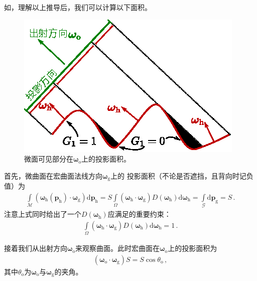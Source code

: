 如，理解以上推导后，我们可以计算以下面积。
\begin{figure}[htbp]
    \centering
    \includegraphics[width=0.5\linewidth]{Pictures/chap08/ProjectionsMicrofacet.eps}
    \caption{微面可见部分在${\bm\omega}_{\mathrm{o}}$上的投影面积。}
    \label{fig:08ex01-ProjectionsMicrofacetArea}
\end{figure}

首先，微曲面在宏曲面法线方向${\bm\omega}_{\mathrm{g}}$上的
投影面积（不论是否遮挡，且背向时记负值）为
\begin{align}
    \int\limits_{\mathcal{M}}({\bm\omega}_{\mathrm{h}}({\bm p}_{\mathrm{h}})
    \cdot{\bm\omega}_{\mathrm{g}})\mathrm{d}{\bm p}_{\mathrm{h}}
    =S\int\limits_{\varOmega}({\bm\omega}_{\mathrm{h}}\cdot{\bm\omega}_{\mathrm{g}})
    D({\bm\omega}_{\mathrm{h}})\mathrm{d}{\bm\omega}_{\mathrm{h}}
    =\int\limits_{\mathcal{G}}\mathrm{d}{\bm p}_{\mathrm{g}}=S\, .
\end{align}
注意上式同时给出了一个$D({\bm\omega}_{\mathrm{h}})$应满足的重要约束：
\begin{align}\label{eq:08ex01-McrofacetDistributionNormalization}
    \int\limits_{\varOmega}({\bm\omega}_{\mathrm{h}}\cdot{\bm\omega}_{\mathrm{g}})
    D({\bm\omega}_{\mathrm{h}})\mathrm{d}{\bm\omega}_{\mathrm{h}}=1\, .
\end{align}

接着我们从出射方向${\bm\omega}_{\mathrm{o}}$来观察曲面。此时宏曲面在${\bm\omega}_{\mathrm{o}}$上的投影面积为
\begin{align}
    \label{eq:08ex01-AreaMacrosurface}
    ({\bm\omega}_{\mathrm{o}}\cdot{\bm\omega}_{\mathrm{g}})S=S\cos\theta_{\mathrm{o}}\, ,
\end{align}
其中$\theta_{\mathrm{o}}$为${\bm\omega}_{\mathrm{o}}$与${\bm\omega}_{\mathrm{g}}$的夹角。


